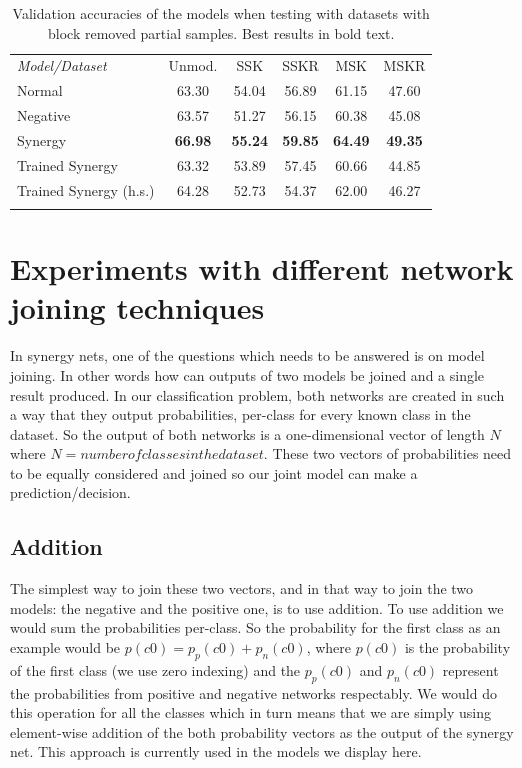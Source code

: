 \documentclass[b5paper]{book}
\begin{document}
\begin{table}
\centering
\caption{Validation accuracies of the models when testing with datasets with block removed partial samples. Best results in bold text.}
\label{tab:9}
\tabcolsep=0.06cm
\begin{tabular}{lccccc}
\hline\noalign{\smallskip}
\emph{Model/Dataset} & Unmod. & SSK & SSKR & MSK & MSKR \\
\noalign{\smallskip}\hline\noalign{\smallskip}
Normal & 63.30 & 54.04 & 56.89 & 61.15 & 47.60 \\
Negative & 63.57 & 51.27 & 56.15 & 60.38 & 45.08 \\
Synergy & \textbf{66.98} & \textbf{55.24} & \textbf{59.85} & \textbf{64.49} & \textbf{49.35}\\
Trained Synergy & 63.32 & 53.89 & 57.45 & 60.66 & 44.85\\
Trained Synergy (h.s.) & 64.28 & 52.73 & 54.37 & 62.00 & 46.27 \\
\noalign{\smallskip}\hline
\end{tabular}
\end{table}

\section{Experiments with different network joining techniques}

In synergy nets, one of the questions which needs to be answered is on model joining. In other words how can outputs of two models be joined and a single result produced. In our classification problem, both networks are created in such a way that they output probabilities, per-class for every known class in the dataset. So the output of both networks is a one-dimensional vector of length \( N \) where \( N = number of classes in the dataset \). These two vectors of probabilities need to be equally considered and joined so our joint model can make a prediction/decision.

\subsection{Addition}

The simplest way to join these two vectors, and in that way to join the two models: the negative and the positive one, is to use addition. To use addition we would sum the probabilities per-class. So the probability for the first class as an example would be \( p(c0) = p_p(c0) + p_n(c0) \), where \( p(c0) \) is the probability of the first class (we use zero indexing) and the \(p_p(c0)\) and \(p_n(c0)\) represent the probabilities from positive and negative networks respectably. We would do this operation for all the classes which in turn means that we are simply using element-wise addition of the both probability vectors as the output of the synergy net. This approach is currently used in the models we display here.
\end{document}
